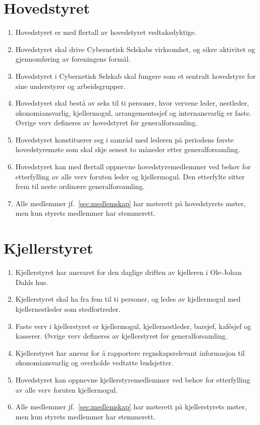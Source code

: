 \documentclass[8pt,norsk,a4paper]{article}
\begin{document}
\section{Hovedstyret}
\begin{enumerate}
	\item{Hovedstyret er med  flertall av hovedstyret vedtaksdyktige.}
	\item{Hovedstyret skal drive Cybernetisk Selskabs virksomhet, og sikre aktivitet og gjennomføring av foreningens formål.}
	\item{Hovedstyret i Cybernetisk Selskab skal fungere som et sentralt hovedstyre for sine understyrer og arbeidsgrupper.}
	\item{Hovedstyret skal bestå av seks til ti personer, hvor vervene leder, nestleder, økonomiansvarlig, kjellermogul, arrangementssjef og internansvarlig er faste. Øvrige verv defineres av hovedstyret før generalforsamling.\label{sec:hs-antall}}
	\item{Hovedstyret konstituerer seg i samråd med lederen på periodens første hovedstyremøte som skal skje senest to måneder etter generalforsamling.}
	\item{\label{item:etterfylling-hs}Hovedstyret kan med  flertall oppnevne hovedstyremedlemmer ved behov for etterfylling av alle verv foruten leder og kjellermogul. Den etterfylte sitter frem til neste ordinære generalforsamling.} 
	\item{Alle medlemmer jf.~\ref{sec:medlemskap} har møterett på hovedstyrets møter, men kun styrets medlemmer har stemmerett.}
\end{enumerate}

\section{Kjellerstyret}
\begin{enumerate}
	\item{Kjellerstyret har ansvaret for den daglige driften av kjelleren i Ole-Johan Dahls hus.}
	\item{Kjellerstyret skal ha fra fem til ti personer, og ledes av kjellermogul med kjellernestleder som stedfortreder.}
	\item{Faste verv i kjellerstyret er kjellermogul, kjellernestleder, barsjef, kafésjef og kasserer. Øvrige verv defineres av kjellerstyret før generalforsamling.}
	\item{Kjellerstyret har ansvar for å rapportere regnskapsrelevant informasjon til økonomiansvarlig og overholde vedtatte budsjetter.}
	\item{\label{item:etterfylling-ks}Hovedstyret kan oppnevne kjellerstyremedlemmer ved behov for etterfylling av alle verv foruten kjellermogul.}
 	\item{Alle medlemmer jf.~\ref{sec:medlemskap} har møterett på kjellerstyrets møter, men kun styrets medlemmer har stemmerett.}
\end{enumerate}
\end{document}
